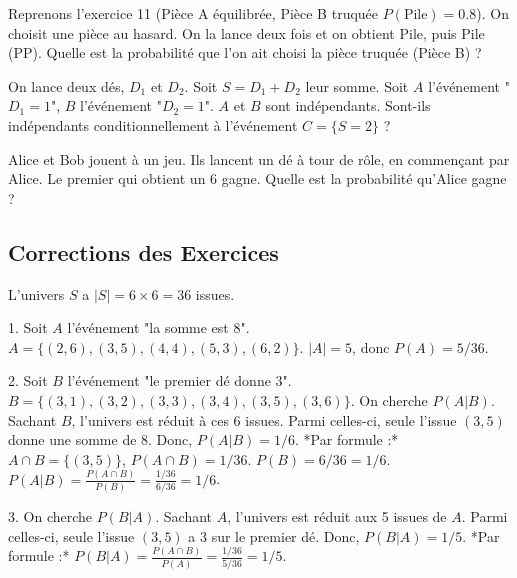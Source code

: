 \begin{exercicebox}
Reprenons l'exercice 11 (Pièce A équilibrée, Pièce B truquée $P(\text{Pile})=0.8$).
On choisit une pièce au hasard. On la lance deux fois et on obtient Pile, puis Pile (PP).
Quelle est la probabilité que l'on ait choisi la pièce truquée (Pièce B) ?
\end{exercicebox}

\begin{exercicebox}
On lance deux dés, $D_1$ et $D_2$. Soit $S = D_1 + D_2$ leur somme.
Soit $A$ l'événement "$D_1 = 1$", $B$ l'événement "$D_2 = 1$".
$A$ et $B$ sont indépendants. Sont-ils indépendants conditionnellement à l'événement $C = \{S = 2\}$ ?
\end{exercicebox}

\begin{exercicebox}
Alice et Bob jouent à un jeu. Ils lancent un dé à tour de rôle, en commençant par Alice. Le premier qui obtient un 6 gagne.
Quelle est la probabilité qu'Alice gagne ?
\end{exercicebox}

\subsection{Corrections des Exercices}


\begin{correctionbox}
L'univers $S$ a $|S| = 6 \times 6 = 36$ issues.

1.  Soit $A$ l'événement "la somme est 8". $A = \{(2,6), (3,5), (4,4), (5,3), (6,2)\}$.
    $|A|=5$, donc $P(A) = 5/36$.

2.  Soit $B$ l'événement "le premier dé donne 3". $B = \{(3,1), (3,2), (3,3), (3,4), (3,5), (3,6)\}$.
    On cherche $P(A|B)$. Sachant $B$, l'univers est réduit à ces 6 issues. Parmi celles-ci, seule l'issue $(3,5)$ donne une somme de 8.
    Donc, $P(A|B) = 1/6$.
    *Par formule :* $A \cap B = \{(3,5)\}$, $P(A \cap B) = 1/36$. $P(B) = 6/36 = 1/6$.
    $P(A|B) = \frac{P(A \cap B)}{P(B)} = \frac{1/36}{6/36} = 1/6$.

3.  On cherche $P(B|A)$. Sachant $A$, l'univers est réduit aux 5 issues de $A$. Parmi celles-ci, seule l'issue $(3,5)$ a 3 sur le premier dé.
    Donc, $P(B|A) = 1/5$.
    *Par formule :* $P(B|A) = \frac{P(A \cap B)}{P(A)} = \frac{1/36}{5/36} = 1/5$.
\end{correctionbox}


